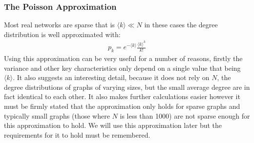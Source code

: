\documentclass{article}
\begin{document}
            \subsubsection{The Poisson Approximation}
            Most real networks are sparse that is $\langle k \rangle \ll N$ in these cases the degree distribution is well approximated with:
            \begin{align*}
                p_{k} = e^{-\langle k \rangle}\frac{{\langle k \rangle}^k}{k!}
            \end{align*}
            Using this approximation can be very useful for a number of reasons, firstly the variance and other key characteristics only depend on a single value that being $\langle k \rangle$. It also suggests an interesting detail, because it does not rely on $N$, the degree distributions of graphs of varying sizes, but the small average degree are in fact identical to each other. It also makes further calculations easier however it must be firmly stated that the approximation only holds for sparse graphs and typically small graphs (those where $N$ is less than 1000) are not sparse enough for this approximation to hold. We will use this approximation later but the requirements for it to hold must be remembered.
\end{document}
